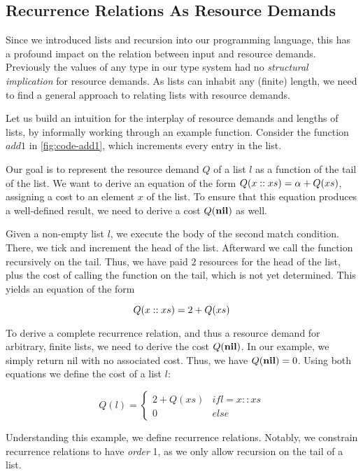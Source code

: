 \subsection{Recurrence Relations As Resource Demands}\label{sec:recurrence-relation}

Since we introduced lists and recursion into our programming language, this has a profound impact on the relation between input and resource demands. Previously the values of any type in our type system had no \emph{structural implication} for resource demands. As lists can inhabit any (finite) length, we need to find a general approach to relating lists with resource demands. 

Let us build an intuition for the interplay of resource demands and lengths of lists, by informally working through an example function. Consider the function \(add1\) in \cref{fig:code-add1}, which increments every entry in the list.

Our goal is to represent the resource demand \(Q\) of a list \(l\) as a function of the tail of the list. We want to derive an equation of the form \(Q(x :: xs) = \alpha + Q(xs)\), assigning a cost to an element \(x\) of the list. To ensure that this equation produces a well-defined result, we need to derive a cost \(Q(\textbf{nil})\) as well.

Given a non-empty list \(l\), we execute the body of the second match condition. There, we tick and increment the head of the list. Afterward we call the function recursively on the tail. Thus, we have paid \(2\) resources for the head of the list, plus the cost of calling the function on the tail, which is not yet determined. This yields an equation of the form 

\[
   Q(x :: xs) = 2 + Q(xs)
\]


To derive a complete recurrence relation, and thus a resource demand for arbitrary, finite lists, we need to derive the cost \(Q(\textbf{nil})\). In our example, we simply return nil with no associated cost. Thus, we have \(Q(\textbf{nil}) = 0\). Using both equations we define the cost of a list \(l\):

\[
   Q(l) = \begin{cases*}
      2 + Q(xs)            & if l = x :: xs\\
      0                    & else
   \end{cases*}
\]

Understanding this example, we define recurrence relations. Notably, we constrain recurrence relations to have \emph{order} 1, as we only allow recursion on the tail of a list. 


